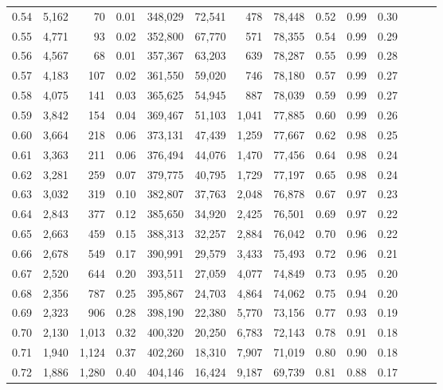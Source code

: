 \begin{tabular}{rrrrrrrrrrrrrr}
0.54 &  5,162 &     70 &  0.01 &  348,029 &   72,541 &     478 &  78,448 &  0.52 &  0.99 &      0.30 \\
0.55 &  4,771 &     93 &  0.02 &  352,800 &   67,770 &     571 &  78,355 &  0.54 &  0.99 &      0.29 \\
0.56 &  4,567 &     68 &  0.01 &  357,367 &   63,203 &     639 &  78,287 &  0.55 &  0.99 &      0.28 \\
0.57 &  4,183 &    107 &  0.02 &  361,550 &   59,020 &     746 &  78,180 &  0.57 &  0.99 &      0.27 \\
0.58 &  4,075 &    141 &  0.03 &  365,625 &   54,945 &     887 &  78,039 &  0.59 &  0.99 &      0.27 \\
0.59 &  3,842 &    154 &  0.04 &  369,467 &   51,103 &   1,041 &  77,885 &  0.60 &  0.99 &      0.26 \\
0.60 &  3,664 &    218 &  0.06 &  373,131 &   47,439 &   1,259 &  77,667 &  0.62 &  0.98 &      0.25 \\
0.61 &  3,363 &    211 &  0.06 &  376,494 &   44,076 &   1,470 &  77,456 &  0.64 &  0.98 &      0.24 \\
0.62 &  3,281 &    259 &  0.07 &  379,775 &   40,795 &   1,729 &  77,197 &  0.65 &  0.98 &      0.24 \\
0.63 &  3,032 &    319 &  0.10 &  382,807 &   37,763 &   2,048 &  76,878 &  0.67 &  0.97 &      0.23 \\
0.64 &  2,843 &    377 &  0.12 &  385,650 &   34,920 &   2,425 &  76,501 &  0.69 &  0.97 &      0.22 \\
0.65 &  2,663 &    459 &  0.15 &  388,313 &   32,257 &   2,884 &  76,042 &  0.70 &  0.96 &      0.22 \\
0.66 &  2,678 &    549 &  0.17 &  390,991 &   29,579 &   3,433 &  75,493 &  0.72 &  0.96 &      0.21 \\
0.67 &  2,520 &    644 &  0.20 &  393,511 &   27,059 &   4,077 &  74,849 &  0.73 &  0.95 &      0.20 \\
0.68 &  2,356 &    787 &  0.25 &  395,867 &   24,703 &   4,864 &  74,062 &  0.75 &  0.94 &      0.20 \\
0.69 &  2,323 &    906 &  0.28 &  398,190 &   22,380 &   5,770 &  73,156 &  0.77 &  0.93 &      0.19 \\
0.70 &  2,130 &  1,013 &  0.32 &  400,320 &   20,250 &   6,783 &  72,143 &  0.78 &  0.91 &      0.18 \\
0.71 &  1,940 &  1,124 &  0.37 &  402,260 &   18,310 &   7,907 &  71,019 &  0.80 &  0.90 &      0.18 \\
0.72 &  1,886 &  1,280 &  0.40 &  404,146 &   16,424 &   9,187 &  69,739 &  0.81 &  0.88 &      0.17 \\

\end{tabular}

